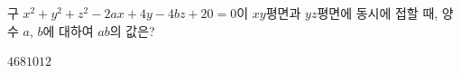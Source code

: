 구 $x^2+y^2+z^2-2ax+4y-4bz+20=0$이 $xy$평면과 $yz$평면에 동시에 접할 때, 양수 $a$, $b$에 대하여 $ab$의 값은?
\begin{choices32}{$4$}{$6$}{$8$}{$10$}{$12$}\end{choices32}

